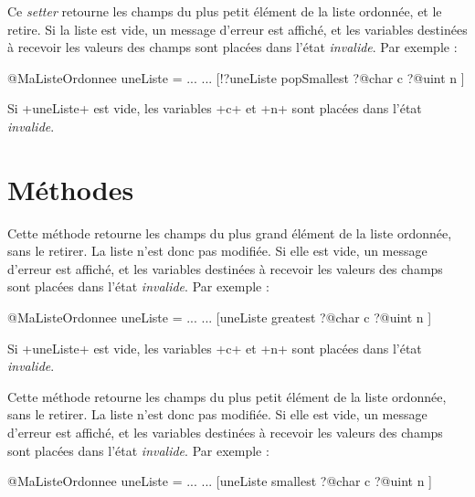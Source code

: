 
Ce \emph{setter} retourne les champs du plus petit élément de la liste ordonnée, et le retire. Si la liste est vide, un message d'erreur est affiché, et les variables destinées à recevoir les valeurs des champs sont placées dans l'état \emph{invalide}. Par exemple :

\begin{galgas}
@MaListeOrdonnee uneListe = ...
...
[!?uneListe popSmallest
  ?@char c
  ?@uint n
]
\end{galgas}

Si \ggs+uneListe+ est vide, les variables \ggs+c+ et \ggs+n+ sont placées dans l'état \emph{invalide}.










\section{Méthodes}


Cette méthode retourne les champs du plus grand élément de la liste ordonnée, sans le retirer. La liste n'est donc pas modifiée. Si elle est vide, un message d'erreur est affiché, et les variables destinées à recevoir les valeurs des champs sont placées dans l'état \emph{invalide}. Par exemple :

\begin{galgas}
@MaListeOrdonnee uneListe = ...
...
[uneListe greatest
  ?@char c
  ?@uint n
]
\end{galgas}

Si \ggs+uneListe+ est vide, les variables \ggs+c+ et \ggs+n+ sont placées dans l'état \emph{invalide}.



Cette méthode retourne les champs du plus petit élément de la liste ordonnée, sans le retirer. La liste n'est donc pas modifiée. Si elle est vide, un message d'erreur est affiché, et les variables destinées à recevoir les valeurs des champs sont placées dans l'état \emph{invalide}. Par exemple :

\begin{galgas}
@MaListeOrdonnee uneListe = ...
...
[uneListe smallest
  ?@char c
  ?@uint n
]
\end{galgas}

